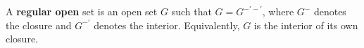 A \textbf{regular open} set is an open set $G$ such that $G = G^{-'-'}$, where $G^{-}$ denotes the closure and $G^{-'}$ denotes the interior. Equivalently, $G$ is the interior of its own closure.
